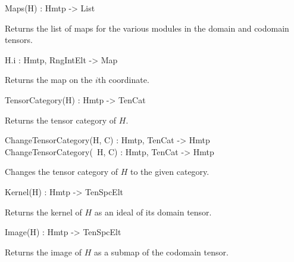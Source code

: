 \begin{intrinsics}
Maps(H) : Hmtp -> List
\end{intrinsics}

Returns the list of maps for the various modules in the domain and codomain 
tensors.

\begin{intrinsics}
H.i : Hmtp, RngIntElt -> Map
\end{intrinsics}

Returns the map on the $i$th coordinate.

\begin{intrinsics}
TensorCategory(H) : Hmtp -> TenCat
\end{intrinsics}

Returns the tensor category of $H$.

\begin{intrinsics}
ChangeTensorCategory(H, C) : Hmtp, TenCat -> Hmtp
ChangeTensorCategory(~H, C) : Hmtp, TenCat -> Hmtp
\end{intrinsics}

Changes the tensor category of $H$ to the given category.

\begin{intrinsics}
Kernel(H) : Hmtp -> TenSpcElt
\end{intrinsics}

Returns the kernel of $H$ as an ideal of its domain tensor.

\begin{intrinsics}
Image(H) : Hmtp -> TenSpcElt
\end{intrinsics}

Returns the image of $H$ as a submap of the codomain tensor.

